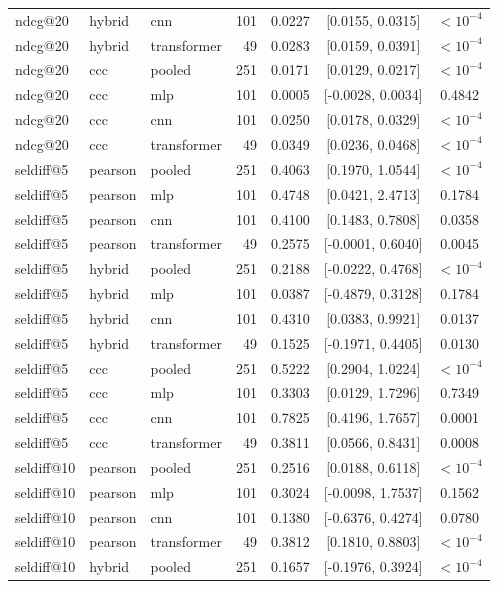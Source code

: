 \begin{longtable}{lllrrcc}
ndcg@20 & hybrid & cnn & 101 & 0.0227 & [0.0155, 0.0315] & $<10^{-4}$ \\
ndcg@20 & hybrid & transformer & 49 & 0.0283 & [0.0159, 0.0391] & $<10^{-4}$ \\
ndcg@20 & ccc & pooled & 251 & 0.0171 & [0.0129, 0.0217] & $<10^{-4}$ \\
ndcg@20 & ccc & mlp & 101 & 0.0005 & [-0.0028, 0.0034] & 0.4842 \\
ndcg@20 & ccc & cnn & 101 & 0.0250 & [0.0178, 0.0329] & $<10^{-4}$ \\
ndcg@20 & ccc & transformer & 49 & 0.0349 & [0.0236, 0.0468] & $<10^{-4}$ \\
seldiff@5 & pearson & pooled & 251 & 0.4063 & [0.1970, 1.0544] & $<10^{-4}$ \\
seldiff@5 & pearson & mlp & 101 & 0.4748 & [0.0421, 2.4713] & 0.1784 \\
seldiff@5 & pearson & cnn & 101 & 0.4100 & [0.1483, 0.7808] & 0.0358 \\
seldiff@5 & pearson & transformer & 49 & 0.2575 & [-0.0001, 0.6040] & 0.0045 \\
seldiff@5 & hybrid & pooled & 251 & 0.2188 & [-0.0222, 0.4768] & $<10^{-4}$ \\
seldiff@5 & hybrid & mlp & 101 & 0.0387 & [-0.4879, 0.3128] & 0.1784 \\
seldiff@5 & hybrid & cnn & 101 & 0.4310 & [0.0383, 0.9921] & 0.0137 \\
seldiff@5 & hybrid & transformer & 49 & 0.1525 & [-0.1971, 0.4405] & 0.0130 \\
seldiff@5 & ccc & pooled & 251 & 0.5222 & [0.2904, 1.0224] & $<10^{-4}$ \\
seldiff@5 & ccc & mlp & 101 & 0.3303 & [0.0129, 1.7296] & 0.7349 \\
seldiff@5 & ccc & cnn & 101 & 0.7825 & [0.4196, 1.7657] & 0.0001 \\
seldiff@5 & ccc & transformer & 49 & 0.3811 & [0.0566, 0.8431] & 0.0008 \\
seldiff@10 & pearson & pooled & 251 & 0.2516 & [0.0188, 0.6118] & $<10^{-4}$ \\
seldiff@10 & pearson & mlp & 101 & 0.3024 & [-0.0098, 1.7537] & 0.1562 \\
seldiff@10 & pearson & cnn & 101 & 0.1380 & [-0.6376, 0.4274] & 0.0780 \\
seldiff@10 & pearson & transformer & 49 & 0.3812 & [0.1810, 0.8803] & $<10^{-4}$ \\
seldiff@10 & hybrid & pooled & 251 & 0.1657 & [-0.1976, 0.3924] & $<10^{-4}$ \\

\end{longtable}
